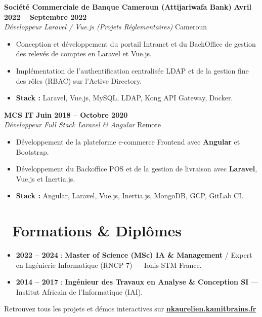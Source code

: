 \documentclass[10pt,a4paper]{article}
\begin{document}
\textbf{\large Société Commerciale de Banque Cameroun (Attijariwafa Bank)} \hfill {\bfseries\small\color{slateGray} Avril 2022 -- Septembre 2022} \\
\emph{\color{primary}Développeur Laravel / Vue.js (Projets Réglementaires)} \hfill {\small Cameroun}
\begin{itemize}[leftmargin=1.4em, itemsep=0.18em, topsep=0.15em]
    \item Conception et développement du portail Intranet et du BackOffice de gestion des relevés de comptes en Laravel et Vue.js.
    \item Implémentation de l'authentification centralisée LDAP et de la gestion fine des rôles (RBAC) sur l'Active Directory.
    \item \textbf{Stack :} Laravel, Vue.js, MySQL, LDAP, Kong API Gateway, Docker.
\end{itemize}

\vspace{0.35em}

\textbf{\large MCS IT} \hfill {\bfseries\small\color{slateGray} Juin 2018 -- Octobre 2020} \\
\emph{\color{primary}Développeur Full Stack Laravel \& Angular} \hfill {\small Remote}
\begin{itemize}[leftmargin=1.4em, itemsep=0.18em, topsep=0.15em]
    \item Développement de la plateforme e-commerce Frontend avec \textbf{Angular} et Bootstrap.
    \item Développement du Backoffice POS et de la gestion de livraison avec \textbf{Laravel}, Vue.js et Inertia.js.
    \item \textbf{Stack :} Angular, Laravel, Vue.js, Inertia.js, MongoDB, GCP, GitLab CI.
\end{itemize}

\section{\faGraduationCap\ Formations \& Diplômes}
\begin{itemize}[leftmargin=1.4em, itemsep=0.25em, topsep=0.15em]
    \item \textbf{2022 -- 2024} : \textbf{Master of Science (MSc) IA \& Management} / Expert en Ingénierie Informatique (RNCP 7) --- Ionis-STM France.
    \item \textbf{2014 -- 2017} : \textbf{Ingénieur des Travaux en Analyse \& Conception SI} --- Institut Africain de l'Informatique (IAI).
\end{itemize}

\vspace{0.8em}
\begin{center}
    \footnotesize\color{slateGray}
    Retrouvez tous les projets et démos interactives sur \href{https://nkaurelien.kamitbrains.fr}{\textbf{nkaurelien.kamitbrains.fr}}
\end{center}
\end{document}
